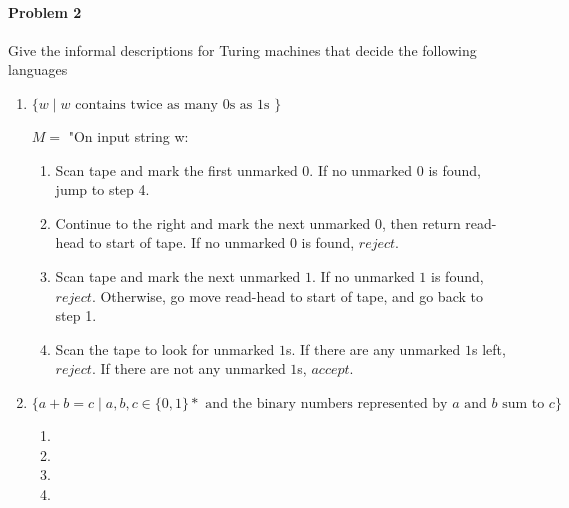 \documentclass{article}
\begin{document}
\paragraph{Problem 2}
Give the informal descriptions for Turing machines that decide the following languages
\begin{enumerate}[\indent a)]
    \item $\{w \;|\; w \text{ contains twice as many 0s as 1s }\}$
    
	$M = $ "On input string w:
	\begin{enumerate}[\indent 1.]
		\item Scan tape and mark the first unmarked $0$. If no unmarked $0$ is found, jump to step 4.
		\item Continue to the right and mark the next unmarked $0$, then return read-head to start of tape. If no unmarked $0$ is found, $reject$.
		\item Scan tape and mark the next unmarked $1$. If no unmarked $1$ is found, $reject$. Otherwise, go move read-head to start of tape, and go back to step 1.
		\item Scan the tape to look for unmarked $1$s. If there are any unmarked $1$s left, $reject$. If there are not any unmarked $1$s, $accept$.	
    \end{enumerate}


    \item $\{a+b=c \;|\; a,b,c \in \{0,1\}* \text{ and the binary numbers represented by $a$ 
    and $b$ sum to $c$} \}$
    
    \begin{enumerate}[\indent 1.]
		\item 
		\item 
		\item 
		\item 
    \end{enumerate}



\end{enumerate}
\end{document}
